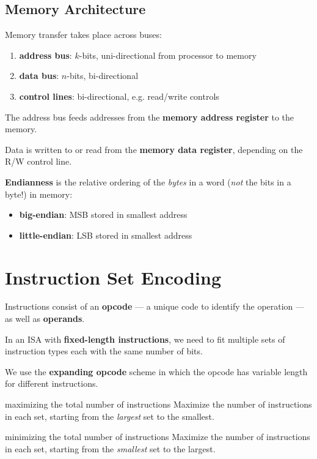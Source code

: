 \subsection{Memory Architecture}
Memory transfer takes place across buses:

\begin{enumerate}
    \item \textbf{address bus}: $k$-bits, uni-directional from processor to memory
    \item \textbf{data bus}: $n$-bits, bi-directional
    \item \textbf{control lines}: bi-directional, e.g. read/write controls
\end{enumerate}

The address bus feeds addresses from the \textbf{memory address register} to the memory.

Data is written to or read from the \textbf{memory data register}, depending on the R/W control line.

\textbf{Endianness} is the relative ordering of the \textit{bytes} in a word (\textit{not} the bits in a byte!) in memory:

\begin{itemize}
    \item \textbf{big-endian}: MSB stored in smallest address
    \item \textbf{little-endian}: LSB stored in smallest address
\end{itemize}

\section{Instruction Set Encoding}
Instructions consist of an \textbf{opcode} --- a unique code to identify the operation 
--- as well as \textbf{operands}.

In an ISA with \textbf{fixed-length instructions}, we need to fit multiple sets of instruction
types each with the same number of bits.

We use the \textbf{expanding opcode} scheme in which the opcode has variable length
for different instructions.

\begin{defn}{maximizing the total number of instructions}
    Maximize the number of instructions in each set,
    starting from the \textit{largest} set to the smallest.
\end{defn}

\begin{defn}{minimizing the total number of instructions}
    Maximize the number of instructions in each set,
    starting from the \textit{smallest} set to the largest.
\end{defn}